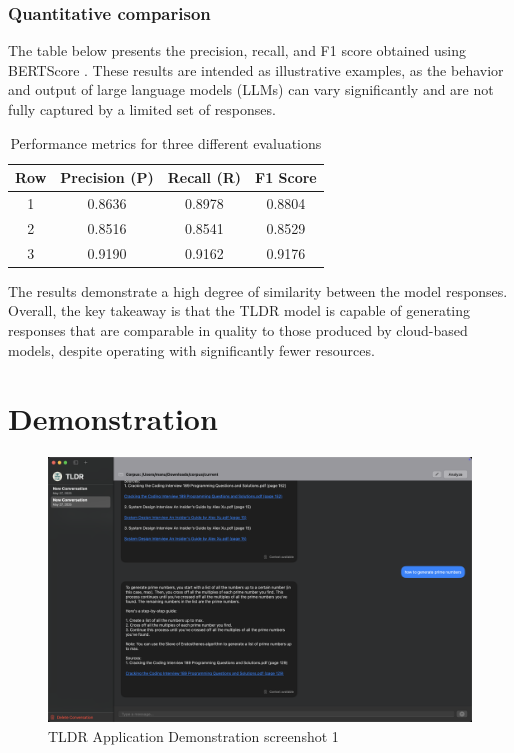 \subsubsection{Quantitative comparison}
\label{subsubsec:tldrresultQuantitativecomparison}
The table below presents the precision, recall, and F1 score obtained using BERTScore \cite{bert-score}. These results are intended as illustrative examples, as the behavior and output of large language models (LLMs) can vary significantly and are not fully captured by a limited set of responses.

\begin{table}[h!]
\centering
\begin{tabular}{|c|c|c|c|}
\hline
\textbf{Row} & \textbf{Precision (P)} & \textbf{Recall (R)} & \textbf{F1 Score} \\
\hline
1 & 0.8636 & 0.8978 & 0.8804 \\
2 & 0.8516 & 0.8541 & 0.8529 \\
3 & 0.9190 & 0.9162 & 0.9176 \\
\hline
\end{tabular}
\caption{Performance metrics for three different evaluations}
\label{tab:metrics}
\end{table}
The results demonstrate a high degree of similarity between the model responses. Overall, the key takeaway is that the TLDR model is capable of generating responses that are comparable in quality to those produced by cloud-based models, despite operating with significantly fewer resources.
\section{Demonstration}
\label{Demonstration}
\begin{figure}[h]
    \centering
    \includegraphics[width=1.0\linewidth]{images/result1.png}
    \caption{TLDR Application  Demonstration screenshot 1}
    \label{fig:tldrAppDemoSc1}
\end{figure}

